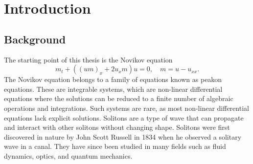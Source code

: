 \documentclass[english,master]{liumaiex}
\theoremstyle{plain}
\theoremstyle{definition}
\begin{document}




\tableofcontents

\newpage



%
%

\section{Introduction}

\subsection{Background}

The starting point of this thesis is the Novikov equation
\begin{equation} \label{eq:Novikov}
	m_t + ((um)_x + 2u_xm) u = 0,\quad m = u - u_{xx}.
\end{equation}
The Novikov equation belongs to a family of equations known as peakon equations. These are integrable systems, which are non-linear differential equations where the solutions can be reduced to a finite number of algebraic operations and integrations. Such systems are rare, as most non-linear differential equations lack explicit solutions. Solitons are a type of wave that can propagate and interact with other solitons without changing shape. Solitons were first discovered in nature by John Scott Russell in 1834 when he observed a solitary wave in a canal. They have since been studied in many fields such as fluid dynamics, optics, and quantum mechanics.
\end{document}
